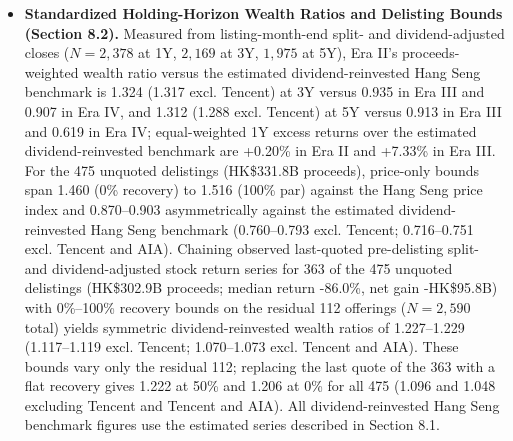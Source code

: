 \documentclass[11pt,letterpaper]{article}
\begin{document}
\begin{itemize}
\item \textbf{Standardized Holding-Horizon Wealth Ratios and Delisting Bounds (Section 8.2).} Measured from listing-month-end split- and dividend-adjusted closes ($N = 2,378$ at 1Y, $2,169$ at 3Y, $1,975$ at 5Y), Era II's proceeds-weighted wealth ratio versus the estimated dividend-reinvested Hang Seng benchmark is 1.324 (1.317 excl. Tencent) at 3Y versus 0.935 in Era III and 0.907 in Era IV, and 1.312 (1.288 excl. Tencent) at 5Y versus 0.913 in Era III and 0.619 in Era IV; equal-weighted 1Y excess returns over the estimated dividend-reinvested benchmark are +0.20\% in Era II and +7.33\% in Era III. For the 475 unquoted delistings (HK\$331.8B proceeds), price-only bounds span 1.460 (0\% recovery) to 1.516 (100\% par) against the Hang Seng price index and 0.870–0.903 asymmetrically against the estimated dividend-reinvested Hang Seng benchmark (0.760–0.793 excl. Tencent; 0.716–0.751 excl. Tencent and AIA). Chaining observed last-quoted pre-delisting split- and dividend-adjusted stock return series for 363 of the 475 unquoted delistings (HK\$302.9B proceeds; median return -86.0\%, net gain -HK\$95.8B) with 0\%–100\% recovery bounds on the residual 112 offerings ($N = 2,590$ total) yields symmetric dividend-reinvested wealth ratios of 1.227–1.229 (1.117–1.119 excl. Tencent; 1.070–1.073 excl. Tencent and AIA). These bounds vary only the residual 112; replacing the last quote of the 363 with a flat recovery gives 1.222 at 50\% and 1.206 at 0\% for all 475 (1.096 and 1.048 excluding Tencent and Tencent and AIA). All dividend-reinvested Hang Seng benchmark figures use the estimated series described in Section 8.1.

\end{itemize}
\end{document}
